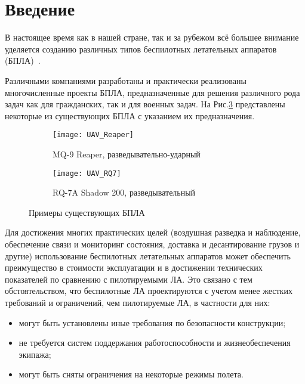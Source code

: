 \chapter*{Введение}

В настоящее время как в нашей стране, так и за рубежом всё большее внимание уделяется созданию различных типов беспилотных летательных аппаратов (БПЛА)~\cite{UAVBook}. 


Различными компаниями разработаны и практически реализованы многочисленные проекты БПЛА, предназначенные для решения различного рода задач как для гражданских, так и для военных задач. На Рис.\ref{fig:UAVs} представлены некоторые из существующих БПЛА с указанием их предназначения.


\begin{figure}[H]
        \begin{subfigure}[b]{0.47\textwidth}
                \texttt{[image: UAV\_Reaper]}
                \caption{MQ-9 Reaper, разведывательно-ударный} %
                \label{fig:UAV_Reaper}
        \end{subfigure}%
        \hspace{\fill}
        \begin{subfigure}[b]{0.47\textwidth}
                \texttt{[image: UAV\_RQ7]}
                \caption{RQ-7A Shadow 200, разведывательный}
                \label{fig:UAV_RQ7}
        \end{subfigure}
        \caption{Примеры существующих БПЛА}\label{fig:UAVs}
\end{figure}

Для достижения многих практических целей (воздушная разведка и наблюдение, обеспечение связи и мониторинг состояния, доставка и десантирование грузов и другие) использование беспилотных летательных аппаратов может обеспечить преимущество в стоимости эксплуатации и в достижении технических показателей по сравнению с пилотируемыми ЛА. Это связано с тем обстоятельством, что беспилотные ЛА проектируются с учетом менее жестких требований и ограничений, чем пилотируемые ЛА, в частности для них:

\begin{itemize}
\item могут быть установлены иные требования по безопасности конструкции;
\item не требуется систем поддержания работоспособности и жизнеобеспечения экипажа;
\item могут быть сняты ограничения на некоторые режимы полета.
\end{itemize} 

